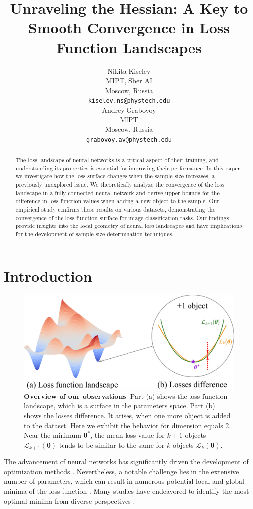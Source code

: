 \documentclass{article}
\title{Unraveling the Hessian: A Key to Smooth Convergence in Loss Function Landscapes}
\author{%
  Nikita Kiselev\\
  MIPT, Sber AI\\
  Moscow, Russia\\
  \texttt{kiselev.ns@phystech.edu}\\
  \And
  Andrey Grabovoy\\
  MIPT\\
  Moscow, Russia\\
  \texttt{grabovoy.av@phystech.edu}\\
}
\begin{document}
\maketitle

\begin{abstract}
    The loss landscape of neural networks is a critical aspect of their training, and understanding its properties is essential for improving their performance. In this paper, we investigate how the loss surface changes when the sample size increases, a previously unexplored issue. We theoretically analyze the convergence of the loss landscape in a fully connected neural network and derive upper bounds for the difference in loss function values when adding a new object to the sample. Our empirical study confirms these results on various datasets, demonstrating the convergence of the loss function surface for image classification tasks. Our findings provide insights into the local geometry of neural loss landscapes and have implications for the development of sample size determination techniques.
\end{abstract}

\section{Introduction}\label{sec:intro}

\begin{figure}[ht]
    \centering
    \includegraphics[width=0.65\linewidth]{losses_difference.pdf}
    \caption{\textbf{Overview of our observations.} Part (a) shows the loss function landscape, which is a surface in the parameters space. Part (b) shows the losses difference. It arises, when one more object is added to the dataset. Here we exhibit the behavior for dimension equals 2. Near the minimum $\boldsymbol{\theta}^*$, the mean loss value for $k+1$ objects $\mathcal{L}_{k+1}(\boldsymbol{\theta})$ tends to be similar to the same for $k$ objects $\mathcal{L}_{k}(\boldsymbol{\theta})$.}
    \label{fig:overview}
\end{figure}

The advancement of neural networks has significantly driven the development of optimization methods \cite{choi2020empiricalcomparisonsoptimizersdeep, Soydaner_2020, schmidt2021descendingcrowdedvalley}. Nevertheless, a notable challenge lies in the extensive number of parameters, which can result in numerous potential local and global minima of the loss function \cite{neyshabur2018the, zou2019improvedanalysistrainingoverparameterized, allenzhu2019convergencetheorydeeplearning, allenzhu2020learninggeneralizationoverparameterizedneural}. Many studies have endeavored to identify the most optimal minima from diverse perspectives \cite{choromanska2015losssurfacesmultilayernetworks, you2017largebatchtrainingconvolutional, li2018visualizinglosslandscapeneural}.
\end{document}
